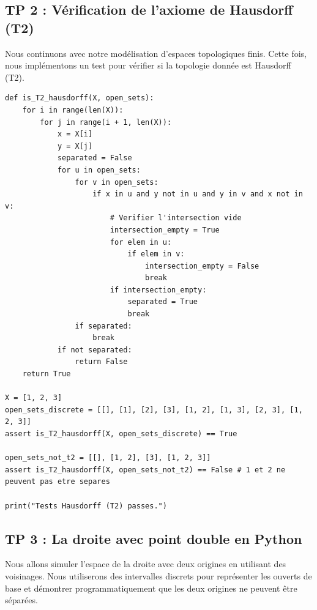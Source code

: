 \documentclass[11pt,a4paper]{article}
\begin{document}
\subsection{TP 2 : Vérification de l'axiome de Hausdorff (T2)}


Nous continuons avec notre modélisation d'espaces topologiques finis. Cette fois, nous implémentons un test pour vérifier si la topologie donnée est Hausdorff (T2).

\begin{lstlisting}
def is_T2_hausdorff(X, open_sets):
    for i in range(len(X)):
        for j in range(i + 1, len(X)):
            x = X[i]
            y = X[j]
            separated = False
            for u in open_sets:
                for v in open_sets:
                    if x in u and y not in u and y in v and x not in v:
                        # Verifier l'intersection vide
                        intersection_empty = True
                        for elem in u:
                            if elem in v:
                                intersection_empty = False
                                break
                        if intersection_empty:
                            separated = True
                            break
                if separated:
                    break
            if not separated:
                return False
    return True

X = [1, 2, 3]
open_sets_discrete = [[], [1], [2], [3], [1, 2], [1, 3], [2, 3], [1, 2, 3]]
assert is_T2_hausdorff(X, open_sets_discrete) == True

open_sets_not_t2 = [[], [1, 2], [3], [1, 2, 3]]
assert is_T2_hausdorff(X, open_sets_not_t2) == False # 1 et 2 ne peuvent pas etre separes

print("Tests Hausdorff (T2) passes.")
\end{lstlisting}





\subsection{TP 3 : La droite avec point double en Python}


Nous allons simuler l'espace de la droite avec deux origines en utilisant des voisinages.
Nous utiliserons des intervalles discrets pour représenter les ouverts de base et démontrer programmatiquement que les deux origines ne peuvent être séparées.
\end{document}
